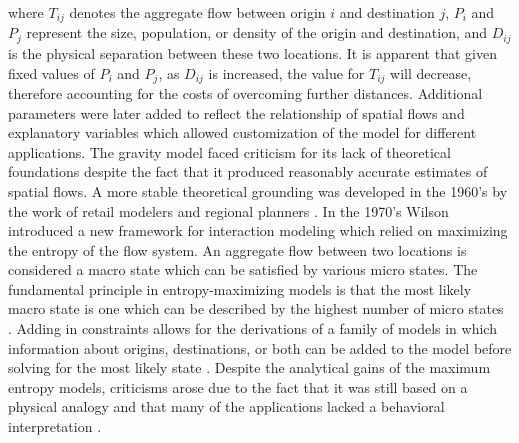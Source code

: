 \documentclass[12pt,a4paper]{thesis}
\begin{document}
where $T_{ij}$ denotes the aggregate flow between origin $i$ and destination $j$, $P_{i}$ and $P_{j}$ represent the size, population, or density of the origin and destination, and $D_{ij}$ is the physical separation between these two locations. It is apparent that given fixed values of $P_{i}$ and $P_{j}$, as $D_{ij}$ is increased, the value for $T_{ij}$ will decrease, therefore accounting for the costs of overcoming further distances. Additional parameters were later added to reflect the relationship of spatial flows and explanatory variables \citep{FotBruCha02} which allowed customization of the model for different applications.  The gravity model faced criticism for its lack of theoretical foundations despite the fact that it produced reasonably accurate estimates of spatial flows.  A more stable theoretical grounding was developed in the 1960's by the work of retail modelers and regional planners \citep{RoyThi04}. In the 1970's Wilson introduced a new framework for interaction modeling which relied on maximizing the entropy of the flow system. An aggregate flow between two locations is considered a macro state which can be satisfied by various micro states. The fundamental principle in entropy-maximizing models is that the most likely macro state is one which can be described by the highest number of micro states \citep{FotBruCha02}. Adding in constraints allows for the derivations of a family of models in which information about origins, destinations, or both can be added to the model before solving for the most likely state \citep{Wil10}. Despite the analytical gains of the maximum entropy models, criticisms arose due to the fact that it was still based on a physical analogy and that many of the applications lacked a behavioral interpretation \citep{Oke04}.
\end{document}

